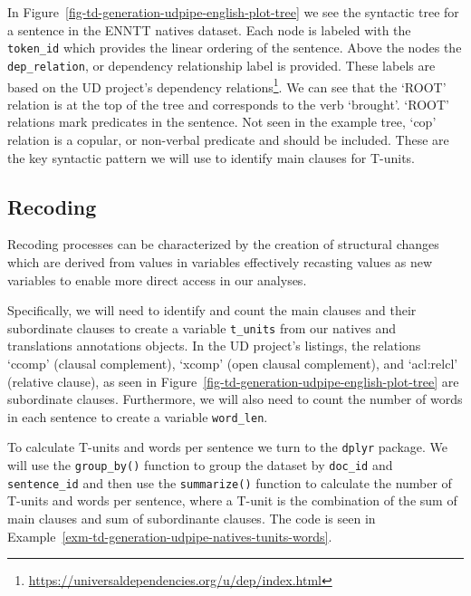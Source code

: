 \documentclass[
  letterpaper,
  DIV=11,
  numbers=noendperiod]{scrreprt}
\theoremstyle{definition}
\theoremstyle{remark}
\DeclareRobustCommand{\href}[2]{#2\footnote{\url{#1}}}
\begin{document}
In Figure~\ref{fig-td-generation-udpipe-english-plot-tree} we see the
syntactic tree for a sentence in the ENNTT natives dataset. Each node is
labeled with the \texttt{token\_id} which provides the linear ordering
of the sentence. Above the nodes the \texttt{dep\_relation}, or
dependency relationship label is provided. These labels are based on the
UD project's
\href{https://universaldependencies.org/u/dep/index.html}{dependency
relations}. We can see that the `ROOT' relation is at the top of the
tree and corresponds to the verb `brought'. `ROOT' relations mark
predicates in the sentence. Not seen in the example tree, `cop' relation
is a copular, or non-verbal predicate and should be included. These are
the key syntactic pattern we will use to identify main clauses for
T-units.

\subsection{Recoding}\label{sec-td-recoding}

Recoding processes can be characterized by the creation of structural
changes which are derived from values in variables effectively recasting
values as new variables to enable more direct access in our analyses.

Specifically, we will need to identify and count the main clauses and
their subordinate clauses to create a variable \texttt{t\_units} from
our natives and translations annotations objects. In the UD project's
listings, the relations `ccomp' (clausal complement), `xcomp' (open
clausal complement), and `acl:relcl' (relative clause), as seen in
Figure~\ref{fig-td-generation-udpipe-english-plot-tree} are subordinate
clauses. Furthermore, we will also need to count the number of words in
each sentence to create a variable \texttt{word\_len}.

To calculate T-units and words per sentence we turn to the
\texttt{dplyr} package. We will use the \texttt{group\_by()} function to
group the dataset by \texttt{doc\_id} and \texttt{sentence\_id} and then
use the \texttt{summarize()} function to calculate the number of T-units
and words per sentence, where a T-unit is the combination of the sum of
main clauses and sum of subordinante clauses. The code is seen in
Example~\ref{exm-td-generation-udpipe-natives-tunits-words}.
\end{document}
